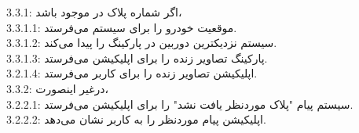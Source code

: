 \documentclass[oneside,a4paper,12pt]{book}
\begin{document}
 3.3.1: اگر شماره پلاک در  موجود باشد، \\

\hspace{1cm} 3.3.1.1:  موقعیت خودرو را برای سیستم می‌فرستد.\\

\hspace{1cm} 3.3.1.2: سیستم نزدیکترین دوربین در پارکینگ را پیدا می‌کند.\\

\hspace{1cm} 3.3.1.3: پارکینگ تصاویر زنده را برای اپلیکیشن می‌فرستد.\\

\hspace{1cm} 3.2.1.4: اپلیکیشن تصاویر زنده را برای کاربر می‌فرستد.\\

3.3.2: درغیر اینصورت،\\

\hspace{1cm} 3.2.2.1: سیستم پیام "پلاک موردنظر یافت نشد" را برای اپلیکیشن می‌فرستد.\\

\hspace{1cm} 3.2.2.2: اپلیکیشن پیام موردنظر را به کاربر نشان می‌دهد. \\\\
\end{document}
